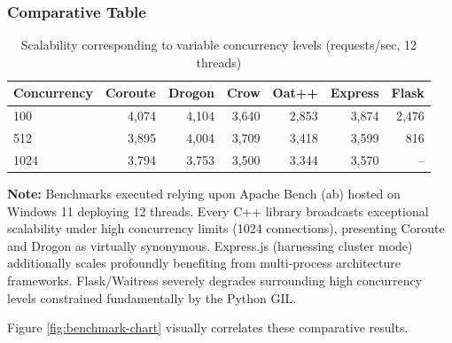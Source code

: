 \subsubsection{Comparative Table}

\begin{table}[H]
\centering
\caption{Scalability corresponding to variable concurrency levels (requests/sec, 12 threads)}
\label{tab:benchmark-concurrency}
\begin{tabular}{|l|r|r|r|r|r|r|}
\hline
\textbf{Concurrency} & \textbf{Coroute} & \textbf{Drogon} & \textbf{Crow} & \textbf{Oat++} & \textbf{Express} & \textbf{Flask} \\
\hline
100 & 4,074 & 4,104 & 3,640 & 2,853 & 3,874 & 2,476 \\
512 & 3,895 & 4,004 & 3,709 & 3,418 & 3,599 & 816 \\
1024 & 3,794 & 3,753 & 3,500 & 3,344 & 3,570 & -- \\
\hline
\end{tabular}
\end{table}

\textbf{Note:} Benchmarks executed relying upon Apache Bench (ab) hosted on Windows 11 deploying 12 threads. Every C++ library broadcasts exceptional scalability under high concurrency limits (1024 connections), presenting Coroute and Drogon as virtually synonymous. Express.js (harnessing cluster mode) additionally scales profoundly benefiting from multi-process architecture frameworks. Flask/Waitress severely degrades surrounding high concurrency levels constrained fundamentally by the Python GIL.

Figure \ref{fig:benchmark-chart} visually correlates these comparative results.

